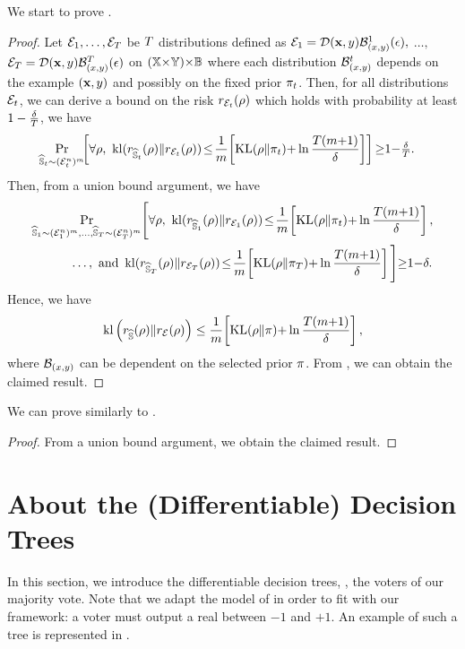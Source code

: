 \begin{noaddcontents}
We start to prove .

\corollaryseegerchromaticT*
\begin{proof}

Let $\Dpert_1,\dots, \Dpert_\iter$ be $\iter$ distributions defined as $\Dpert_1= \D(\x,\y)\DX^1(\epsilon),$ $\dots,$ $\Dpert_\iter=\D(\x,\y)\DX^\iter(\epsilon)$ on $(\X{\times}\Y){\times}\Xpert$ where each distribution $\DX^\t$ depends on the example $(\x,\y)$ and possibly on the fixed prior $\Pt$.
Then, for all distributions $\Dpert_\t$, we can derive a bound on the risk $\RiskS_{\Dpert_\t}(\Q)$ which holds with probability at least $1-\frac{\delta}{\iter}$, we have
\begin{align*}
    \Pr_{\Spert_t\sim(\Dpert_t^n)^\m}\!\!&\LB\forall\Q,\  \kl(\RiskS_{\Spert_\t}(\Q)\|\RiskS_{\Dpert_\t}(\Q)) \!\le\! \frac{1}{\m}\!\LB\KL(\Q\|\Pt){+}\ln\frac{\iter(\m{+}1)}{\delta} \RB \RB {\ge} 1{-}\tfrac{\delta}{\iter}.
\end{align*}
Then, from a union bound argument, we have 
\begin{align*}
    \Pr_{\Spert_1\sim(\Dpert_1^n)^\m,\dots, \Spert_T\sim(\Dpert_T^n)^\m}&\Bigg[\forall\Q,\  \kl(\RiskS_{\Spert_1}(\Q)\|\RiskS_{\Dpert_1}(\Q)) \!\le\! \frac{1}{\m}\!\LB\KL(\Q\|\P_t){+}\ln\frac{\iter(\m{+}1)}{\delta} \RB,\\
    &\hspace{-2cm}\dots, \text{ and } \kl(\RiskS_{\Spert_T}(\Q)\|\RiskS_{\Dpert_T}(\Q)) \!\le\! \frac{1}{\m}\!\LB\KL(\Q\|\P_T){+}\ln\frac{\iter(\m{+}1)}{\delta} \RB
    \Bigg]{\ge}1{-}\delta.  
\end{align*}
Hence, we have 
\begin{align*}
    \kl\LP\RiskS_{\Spert}(\Q) \| \RiskS_{\Dpert}(\Q)\RP \le \frac{1}{\m}\!\LB\KL(\Q\|\P){+}\ln\frac{\iter(\m{+}1)}{\delta}\RB,
\end{align*}
where $\DX$ can be dependent on the selected prior $\P$.
From , we can obtain the claimed result.
\end{proof}

We can prove  similarly to .

\corollarymaxmcallesterT*
\begin{proof}
From a union bound argument, we obtain the claimed result.
\end{proof}

\section{About the (Differentiable) Decision Trees}
\label{ap:mv-robustness:section:tree}
In this section, we introduce the differentiable decision trees, \ie, the voters of our majority vote.
Note that we adapt the model of \citet{KontschiederFiterauCriminisiBulo2016} in order to fit with our framework: a voter must output a real between $-1$ and $+1$.
An example of such a tree is represented in .


\end{noaddcontents}
